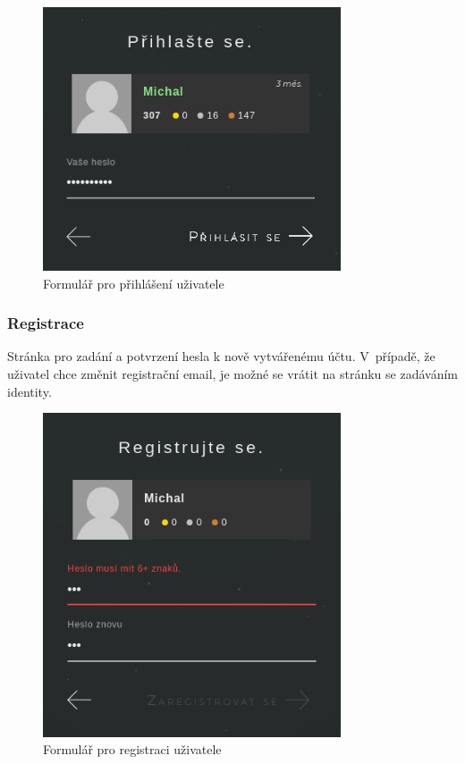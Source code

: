 \documentclass[a4paper,12pt]{article}
\begin{document}
\begin{figure}[H]
\begin{center}
\includegraphics[width=250pt]{Images/SignIn.png}
\caption{Formulář pro přihlášení uživatele}
\label{SignIn}
\end{center}
\end{figure}

\subsubsection{Registrace}

Stránka pro zadání a potvrzení hesla k nově vytvářenému účtu. V~případě, že uživatel chce změnit registrační email, je možné se vrátit na stránku se zadáváním identity.

\begin{figure}[H]
\begin{center}
\includegraphics[width=250pt]{Images/SignUp.png}
\caption{Formulář pro registraci uživatele}
\label{SignUp}
\end{center}
\end{figure}
\end{document}
